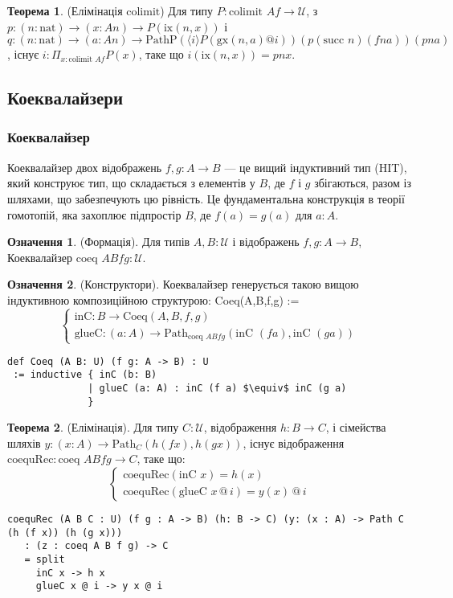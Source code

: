 \documentclass{article}
\theoremstyle{definition}
\newtheorem{theorem}{Теорема}
\newtheorem{definition}{Означення}
\begin{document}
\begin{theorem} (Елімінація \( \text{colimit} \))
Для типу \( P : \text{colimit } A f \to \mathcal{U} \),
з \( p : (n : \text{nat}) \to (x : A n) \to P(\text{ix}(n, x)) \)
і \( q : (n : \text{nat}) \to (a : A n) \to \text{PathP} (\langle i \rangle P(\text{gx}(n, a) @ i)) (p (\text{succ } n) (f n a)) (p n a) \),
існує \( i : \Pi_{x:\text{colimit } A f} P(x) \), таке що \( i(\text{ix}(n, x)) = p n x \).
\end{theorem}

\newpage
\subsection{Коеквалайзери}
\subsubsection*{Коеквалайзер}
Коеквалайзер двох відображень \( f, g : A \to B \) — це вищий індуктивний
тип (HIT), який конструює тип, що складається з елементів у \( B \),
де \( f \) і \( g \) збігаються, разом із шляхами, що забезпечують цю рівність.
Це фундаментальна конструкція в теорії гомотопій,
яка захоплює підпростір \( B \), де \( f(a) = g(a) \) для \( a : A \).

\begin{definition} (Формація).
Для типів \( A, B : \mathcal{U} \) і відображень \( f, g : A \to B \),
Коеквалайзер \( \text{coeq } A B f g : \mathcal{U} \).
\end{definition}

\begin{definition} (Конструктори).
Коеквалайзер генерується такою вищою індуктивною композиційною структурою:
Coeq(A,B,f,g) :=
\[
\begin{cases}
\text{inC} : B \to \text{Coeq}(A,B,f,g) \\
\text{glueC} : (a : A) \to \text{Path}_{\text{coeq } A B f g} (\text{inC } (f a), \text{inC } (g a))
\end{cases}
\]
\begin{lstlisting}[mathescape=true]
def Coeq (A B: U) (f g: A -> B) : U
 := inductive { inC (b: B)
              | glueC (a: A) : inC (f a) $\equiv$ inC (g a)
              }
\end{lstlisting}
\end{definition}

\begin{theorem} (Елімінація).
Для типу \( C : \mathcal{U} \), відображення \( h : B \to C \), і сімейства шляхів \( y : (x : A) \to \text{Path}_C (h (f x), h (g x)) \), існує відображення \( \text{coequRec} : \text{coeq } A B f g \to C \), таке що:
\[
\begin{cases}
\text{coequRec}(\text{inC } x) = h(x) \\
\text{coequRec}(\text{glueC } x \, @ \, i) = y(x) \, @ \, i
\end{cases}
\]
\begin{lstlisting}
coequRec (A B C : U) (f g : A -> B) (h: B -> C) (y: (x : A) -> Path C (h (f x)) (h (g x)))
   : (z : coeq A B f g) -> C
   = split
     inC x -> h x
     glueC x @ i -> y x @ i
\end{lstlisting}
\end{theorem}
\end{document}
